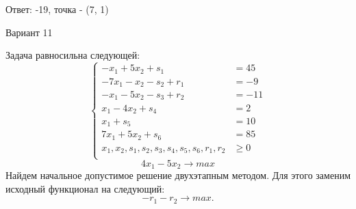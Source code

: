 \documentclass{article}%
\begin{document}
\begin{flushright}%
Ответ: {-}19, точка {-} (7, 1)%
\end{flushright}%
\newpage%
\begin{center}%
\begin{Huge}%
Вариант 11%
\end{Huge}%
\end{center}%
Задача равносильна следующей: %
\[%
\left\{\begin{aligned}-x_{1}+5x_{2}+s_{1} & =45 \\-7x_{1}-x_{2}-s_{2}+r_{1} & =-9 \\-x_{1}-5x_{2}-s_{3}+r_{2} & =-11 \\x_{1}-4x_{2}+s_{4} & =2 \\x_{1}+s_{5} & =10 \\7x_{1}+5x_{2}+s_{6} & =85 \\x_{1},x_{2},s_{1},s_{2},s_{3},s_{4},s_{5},s_{6},r_{1},r_{2} & \ge 0 \\ \end{aligned}\right.%
\]%
\[%
4x_{1}-5x_{2}  \to max%
\]%
Найдем начальное допустимое решение двухэтапным методом. Для этого заменим исходный функционал на следующий: %
\[%
-r_{1}-r_{2}\to max.%
\]%
\end{document}
